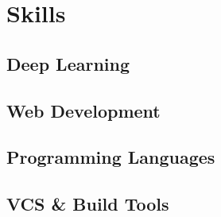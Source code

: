 \documentclass[]{deedy-resume-openfont}
\begin{document}
\begin{minipage}[t]{0.33\textwidth}


	\section{Skills}
	\subsection{Deep Learning}
	\vspace{\topsep} %

	\subsection{Web Development}
	\vspace{\topsep} %

	\subsection{Programming Languages}
	\vspace{\topsep} %

	\subsection{VCS \& Build Tools}
	\vspace{\topsep} %
	\sectionsep





\end{minipage}
\end{document}
